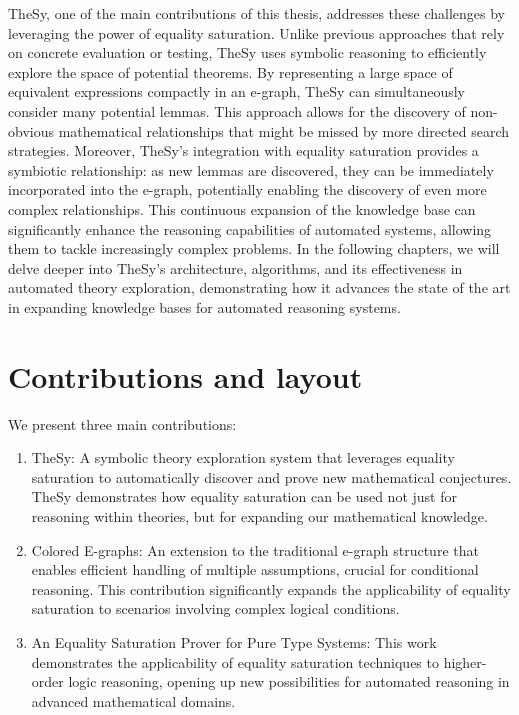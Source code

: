 TheSy, one of the main contributions of this thesis, addresses these challenges by leveraging the power of equality saturation. 
Unlike previous approaches that rely on concrete evaluation or testing, TheSy uses symbolic reasoning to efficiently explore the space of potential theorems.
By representing a large space of equivalent expressions compactly in an e-graph, TheSy can simultaneously consider many potential lemmas. This approach allows for the discovery of non-obvious mathematical relationships that might be missed by more directed search strategies.
Moreover, TheSy's integration with equality saturation provides a symbiotic relationship: as new lemmas are discovered, they can be immediately incorporated into the e-graph, potentially enabling the discovery of even more complex relationships. This continuous expansion of the knowledge base can significantly enhance the reasoning capabilities of automated systems, allowing them to tackle increasingly complex problems.
In the following chapters, we will delve deeper into TheSy's architecture, algorithms, and its effectiveness in automated theory exploration, demonstrating how it advances the state of the art in expanding knowledge bases for automated reasoning systems.


\section{Contributions and layout}

We present three main contributions:

\begin{enumerate}
    \item TheSy: A symbolic theory exploration system that leverages equality saturation to automatically discover and prove new mathematical conjectures. TheSy demonstrates how equality saturation can be used not just for reasoning within theories, but for expanding our mathematical knowledge.
    \item Colored E-graphs: An extension to the traditional e-graph structure that enables efficient handling of multiple assumptions, crucial for conditional reasoning. This contribution significantly expands the applicability of equality saturation to scenarios involving complex logical conditions.
    \item An Equality Saturation Prover for Pure Type Systems: This work demonstrates the applicability of equality saturation techniques to higher-order logic reasoning, opening up new possibilities for automated reasoning in advanced mathematical domains.
\end{enumerate}

